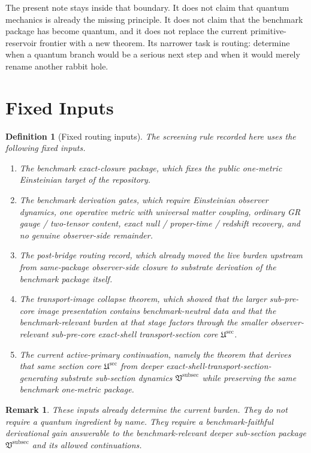 \documentclass[11pt]{article}
\newcommand{\SubPreSectionCore}{\mathfrak U^{\mathrm{sec}}}
\newcommand{\SubSectionPackage}{\mathfrak V^{\mathrm{subsec}}}
\newtheorem{definition}{Definition}
\newtheorem{remark}{Remark}
\begin{document}
The present note stays inside that boundary. It does not claim that quantum mechanics is already the missing principle. It does not claim that the benchmark package has become quantum, and it does not replace the current primitive-reservoir frontier with a new theorem. Its narrower task is routing: determine when a quantum branch would be a serious next step and when it would merely rename another rabbit hole.

\section{Fixed Inputs}

\begin{definition}[Fixed routing inputs]
The screening rule recorded here uses the following fixed inputs.
\begin{enumerate}
    \item The benchmark exact-closure package, which fixes the public one-metric Einsteinian target of the repository.
    \item The benchmark derivation gates, which require Einsteinian observer dynamics, one operative metric with universal matter coupling, ordinary GR gauge / two-tensor content, exact null / proper-time / redshift recovery, and no genuine observer-side remainder.
    \item The post-bridge routing record, which already moved the live burden upstream from same-package observer-side closure to substrate derivation of the benchmark package itself.
    \item The transport-image collapse theorem, which showed that the larger sub-pre-core image presentation contains benchmark-neutral data and that the benchmark-relevant burden at that stage factors through the smaller observer-relevant sub-pre-core exact-shell transport-section core \(\SubPreSectionCore\).
    \item The current active-primary continuation, namely the theorem that derives that same section core \(\SubPreSectionCore\) from deeper exact-shell-transport-section-generating substrate sub-section dynamics \(\SubSectionPackage\) while preserving the same benchmark one-metric package.
\end{enumerate}
\end{definition}

\begin{remark}
These inputs already determine the current burden. They do not require a quantum ingredient by name. They require a benchmark-faithful derivational gain answerable to the benchmark-relevant deeper sub-section package \(\SubSectionPackage\) and its allowed continuations.
\end{remark}
\end{document}
